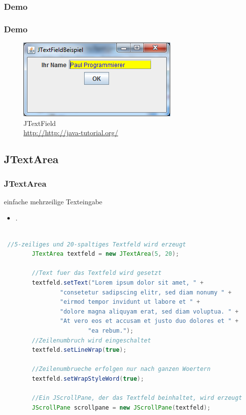 \documentclass[xcolor=dvipsnames]{beamer}
\begin{document}
\subsubsection{Demo}
\begin{frame}
  \frametitle{Demo}
	\begin{figure}
		\includegraphics[scale=0.8]{images/jtextfield.PNG}
		\caption{JTextField \\ \tiny{\textcolor{gray}{\url{http://http://java-tutorial.org/}}}}
		\end{figure}
\end{frame}

\subsection{JTextArea}
\begin{frame}  %
  \frametitle{JTextArea
} %
  \begin{block}{einfache mehrzeilige Texteingabe}
	  \begin{itemize}
		\item .
	  \end{itemize}
  \end{block}

\begin{lstlisting}[language=java,basicstyle=\scriptsize\ttfamily]

 //5-zeiliges und 20-spaltiges Textfeld wird erzeugt
        JTextArea textfeld = new JTextArea(5, 20);
 
        //Text fuer das Textfeld wird gesetzt
        textfeld.setText("Lorem ipsum dolor sit amet, " +
        		"consetetur sadipscing elitr, sed diam nonumy " +
        		"eirmod tempor invidunt ut labore et " +
        		"dolore magna aliquyam erat, sed diam voluptua. " +
        		"At vero eos et accusam et justo duo dolores et " +
                        "ea rebum.");
        //Zeilenumbruch wird eingeschaltet
        textfeld.setLineWrap(true);
 
        //Zeilenumbrueche erfolgen nur nach ganzen Woertern
        textfeld.setWrapStyleWord(true);
 
        //Ein JScrollPane, der das Textfeld beinhaltet, wird erzeugt
        JScrollPane scrollpane = new JScrollPane(textfeld); 

\end{lstlisting}

\end{frame}
\end{document}
